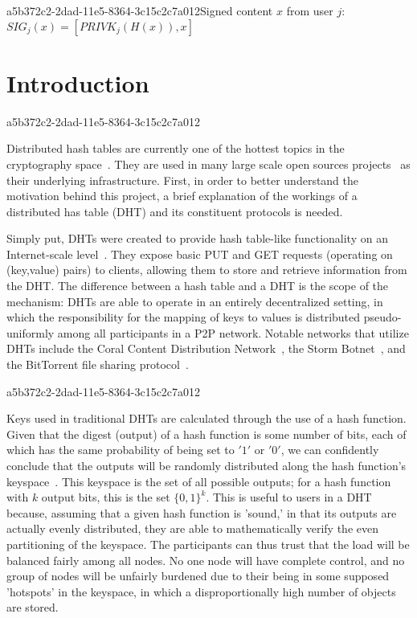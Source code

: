 \documentclass[12pt]{article}
\begin{document}
a5b372c2-2dad-11e5-8364-3c15c2c7a012Signed content $x$ from user $j$: $SIG_j(x) = \left[ PRIVK_j( H(x) ), x \right]$

\section{Introduction}
a5b372c2-2dad-11e5-8364-3c15c2c7a012\par Distributed hash tables are currently one of the hottest topics in the cryptography space~\cite{Stoica:2001dj,Rowstron:2001ea,Ratnasamy:2001wn}. They are used in many large scale open sources projects~\cite{Freitas:2013tb,Xu:2010vs,Perfitt:2010fh} as their underlying infrastructure. First, in order to better understand the motivation behind this project, a brief explanation of the workings of a distributed has table (DHT) and its constituent protocols is needed.

\par Simply put, DHTs were created to provide hash table-like functionality on an Internet-scale level~\cite{Ratnasamy:2001wn}. They expose basic PUT and GET requests (operating on (key,value) pairs) to clients, allowing them to store and retrieve information from the DHT. The difference between a hash table and a DHT is the scope of the mechanism: DHTs are able to operate in an entirely decentralized setting, in which the responsibility for the mapping of keys to values is distributed pseudo-uniformly among all participants in a P2P network. Notable networks that utilize DHTs include the Coral Content Distribution Network~\cite{Freedman:2004vb}, the Storm Botnet~\cite{Holz:2008uk}, and the BitTorrent file sharing protocol~\cite{Cohen:y1_8mBnw}.

a5b372c2-2dad-11e5-8364-3c15c2c7a012\par Keys used in traditional DHTs are calculated through the use of a hash function. Given that the digest (output) of a hash function is some number of bits, each of which has the same probability of being set to $'1'$ or $'0'$, we can confidently conclude that the outputs will be randomly distributed along the hash function's keyspace~. This keyspace is the set of all possible outputs; for a hash function with $k$ output bits, this is the set $\{0,1\}^k$. This is useful to users in a DHT because, assuming that a given hash function is 'sound,' in that its outputs are actually evenly distributed, they are able to mathematically verify the even partitioning of the keyspace. The participants can thus trust that the load will be balanced fairly among all nodes. No one node will have complete control, and no group of nodes will be unfairly burdened due to their being in some supposed 'hotspots' in the keyspace, in which a disproportionally high number of objects are stored.~
\end{document}
